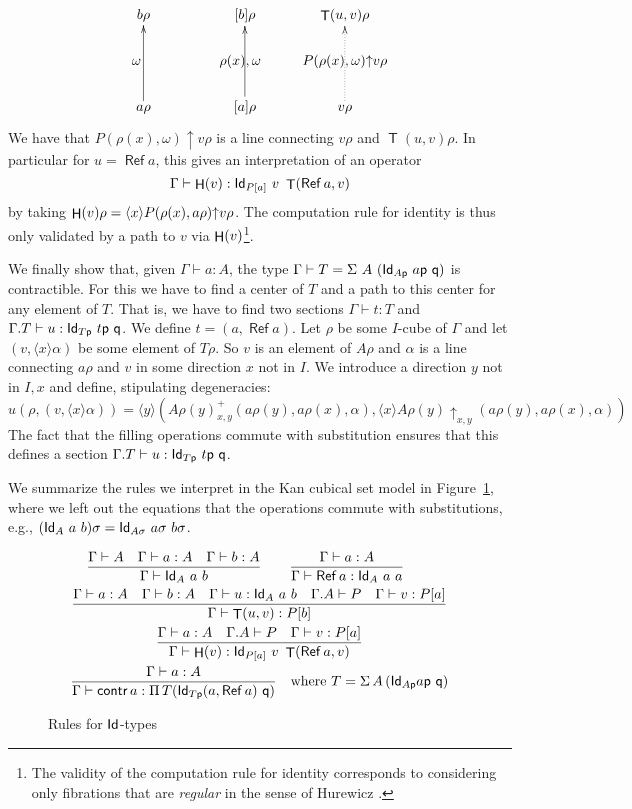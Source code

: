 \documentclass[10pt,a4paper]{article}
\DeclareMathOperator{\Ref}{\mathsf{Ref}}
\DeclareMathOperator{\Transp}{\mathsf{T}}
\DeclareMathOperator{\HH}{{\sf H}}
\newcommand{\Id}{{\sf Id}}
\newcommand{\pp}{{\sf p}}
\newcommand{\qq}{{\sf q}}
\newcommand{\rup}[1]{#1{\uparrow}}
\newcommand{\rupxy}[1]{#1{\uparrow_{x,y}}}
\newcommand{\bind}[2]{{\langle}#1{\rangle}#2}
\begin{document}
\[
\xymatrix@R=.6cm@C=.6cm{
b\rho                 &&[b]\rho                    &   \Transp(u,v)\rho                                 \\
\omega ~~~     &&\rho(x),\omega~~  &\rup{P(\rho(x),\omega)} v\rho \\
a\rho\ar[uu]      &&[a]\rho\ar[uu]       &   v\rho\ar@{.>}[uu]                        \\
}
\]
We have that $\rup{P(\rho(x),\omega)} v\rho$ is a line connecting
$v\rho$ and $\Transp(u,v)\rho$.  In particular for $u=\Ref a$, this gives
an interpretation of an operator
$$
\Gamma\vdash \HH(v):\Id_{P[a]}~v~\Transp(\Ref a,v)
$$
by taking $\HH(v)\rho = \bind{x}{\rup{P(\rho (x),a\rho)} v\rho}$.  The
computation rule for identity is thus only validated by a path to $v$
via $\HH(v)$\footnote{The validity of the computation rule for
  identity corresponds to considering only fibrations that are {\em
    regular} in the sense of Hurewicz \cite{hurewicz}.}.


We finally show that, given $\Gamma\vdash a:A$, the type $\Gamma
\vdash T = \Sigma~A~(\Id_{A\pp}~a\pp~\qq)$ is contractible. For this
we have to find a center of $T$ and a path to this center for any
element of $T$.  That is, we have to find two sections $\Gamma\vdash
t:T$ and $\Gamma.T\vdash u:\Id_{T\pp}~t\pp~\qq$.  We define $t =
(a,\Ref a)$. Let $\rho$ be some $I$-cube of $\Gamma$ and let
$(v,\bind{x}{\alpha})$ be some element of $T\rho$. So $v$ is an
element of $A\rho$ and $\alpha$ is a line connecting $a\rho$ and $v$
in some direction $x$ not in $I$. We introduce a direction $y$ not in
$I,x$ and define, stipulating degeneracies:
$$
u(\rho,(v,\bind{x}{\alpha})) = \bind{y}{(A\rho(y)^+ _{x,y}
  (a\rho(y),a\rho(x),\alpha),\bind{x}{\rupxy{A\rho(y)}
    (a\rho(y),a\rho(x),\alpha)})}
$$
The fact that the filling operations commute with substitution ensures
that this defines a section $\Gamma.T\vdash u:\Id_{T\pp}~t\pp~\qq$.

We summarize the rules we interpret in the Kan cubical set model in
Figure~\ref{fig:idtype}, where we left out the equations that the
operations commute with substitutions, e.g., $(\Id_A~a~b) \sigma =
\Id_{A \sigma}~a\sigma~ b\sigma$.
\begin{figure}[t]
  \label{fig:idtype}
  \caption{Rules for $\Id$-types}
  \begin{gather*}
    \frac {\Gamma \vdash A \quad \Gamma \vdash a : A \quad \Gamma \vdash
      b : A} {\Gamma \vdash \Id_A~a~b} \qquad
    \frac {\Gamma \vdash a : A} {\Gamma\vdash \Ref a:\Id_A~a~a} \qquad
    \\
    \frac {\Gamma\vdash a:A \quad \Gamma\vdash b:A \quad \Gamma\vdash
      u:\Id_A~a~b \quad \Gamma.A \vdash P \quad \Gamma\vdash v:P[a]}
    {\Gamma\vdash \Transp(u,v):P[b]}
    \\
    \frac {\Gamma \vdash a : A \quad \Gamma.A \vdash P \quad \Gamma
      \vdash v : P [a]} {\Gamma \vdash \HH (v):\Id_{P[a]}~v~\Transp(\Ref
      a,v)}
    \\
    \frac {\Gamma \vdash a : A} {\Gamma \vdash \mathsf{contr}\, a :
      \Pi\, T (\Id_{T \pp} (a, \Ref a)~\qq) } \quad \text {where } T =
    \Sigma\,A\,(\Id_{A \pp} a \pp~ \qq)
  \end{gather*}
\end{figure}
\end{document}

